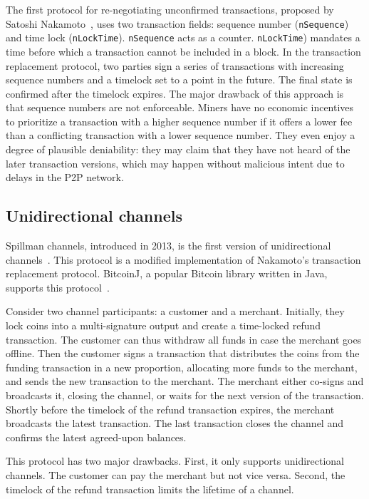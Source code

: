 The first protocol for re-negotiating unconfirmed transactions, proposed by Satoshi Nakamoto~\cite{Hearn2013}, uses two transaction fields: sequence number (\texttt{nSequence}) and time lock (\texttt{nLockTime}).
\texttt{nSequence} acts as a counter.
\texttt{nLockTime}) mandates a time before which a transaction cannot be included in a block.
In the transaction replacement protocol, two parties sign a series of transactions with increasing sequence numbers and a timelock set to a point in the future.
The final state is confirmed after the timelock expires.
The major drawback of this approach is that sequence numbers are not enforceable.
Miners have no economic incentives to prioritize a transaction with a higher sequence number if it offers a lower fee than a conflicting transaction with a lower sequence number.
They even enjoy a degree of plausible deniability: they may claim that they have not heard of the later transaction versions, which may happen without malicious intent due to delays in the P2P network.


\subsection{Unidirectional channels}

Spillman channels, introduced in 2013, is the first version of unidirectional channels~\cite{Spillman2013}.
This protocol is a modified implementation of Nakamoto's transaction replacement protocol.
BitcoinJ, a popular Bitcoin library written in Java, supports this protocol~\cite{BitcoinJ}.

Consider two channel participants: a customer and a merchant.
Initially, they lock coins into a multi-signature output and create a time-locked refund transaction.
The customer can thus withdraw all funds in case the merchant goes offline.
Then the customer signs a transaction that distributes the coins from the funding transaction in a new proportion, allocating more funds to the merchant, and sends the new transaction to the merchant.
The merchant either co-signs and broadcasts it, closing the channel, or waits for the next version of the transaction.
Shortly before the timelock of the refund transaction expires, the merchant broadcasts the latest transaction.
The last transaction closes the channel and confirms the latest agreed-upon balances.

This protocol has two major drawbacks.
First, it only supports unidirectional channels.
The customer can pay the merchant but not vice versa.
Second, the timelock of the refund transaction limits the lifetime of a channel.

